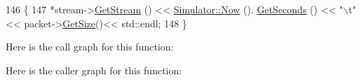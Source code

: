 \begin{DoxyCode}
146 \{
147         *stream->\hyperlink{classns3_1_1OutputStreamWrapper_a0cf30a4188ab6fdae2b2ab74db11acc2}{GetStream} () << \hyperlink{group__simulator_gac3635e2e87f7ce316c89290ee1b01d0d}{Simulator::Now} ().
      \hyperlink{classns3_1_1Time_a8f20d5c3b0902d7b4320982f340b57c8}{GetSeconds} () << \textcolor{stringliteral}{"\(\backslash\)t"} << packet->\hyperlink{classns3_1_1Packet_a462855c9929954d4301a4edfe55f4f1c}{GetSize}()<< std::endl;
148 \}
\end{DoxyCode}


Here is the call graph for this function\+:




Here is the caller graph for this function\+:


